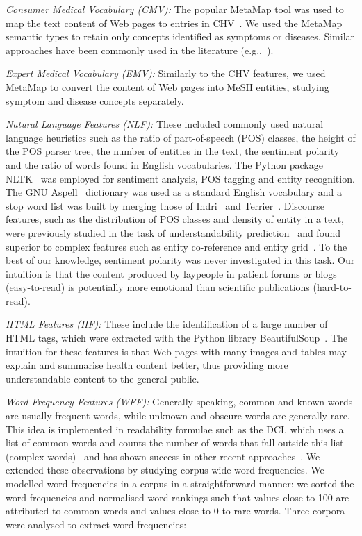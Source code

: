 \documentclass[10pt,a4paper]{article}
\begin{document}
\textit{Consumer Medical Vocabulary (CMV):}
The popular MetaMap \cite{aronson10} tool was used to map the text content of Web pages to entries in  CHV~\cite{zeng06}.
We used the MetaMap semantic types to retain only concepts identified as symptoms or diseases. Similar approaches have been commonly used in the literature (e.g.,~\cite{pang16,agrafiotesA16,palotti16,yates13}).

\textit{Expert Medical Vocabulary (EMV):}
Similarly to the CHV features, we used MetaMap to convert the content of Web pages into MeSH entities, studying symptom and disease concepts separately. 

\textit{Natural Language Features (NLF):}
These included commonly used natural language heuristics such as the ratio of part-of-speech (POS) classes, the height of the POS parser tree, the number of entities in the text, 
the sentiment polarity  and the ratio of words found in English vocabularies. The Python package NLTK~\cite{nltk} was employed for sentiment analysis, POS tagging and entity recognition. The GNU Aspell~\cite{aspell} dictionary was used as a standard English vocabulary and a stop word list was built by merging those of Indri~\cite{indri} and Terrier~\cite{terrier}. 
Discourse features, such as the distribution of POS classes and density of entity in a text, were previously studied in the task of understandability prediction~\cite{feng10} and found superior to complex features such as entity co-reference and entity grid~\cite{barzilay08}. To the best of our knowledge, sentiment polarity was never investigated in this task. Our intuition is that the content produced by laypeople in patient forums or blogs (easy-to-read) is potentially more emotional than scientific publications (hard-to-read).

\textit{HTML Features (HF):}
These include the identification of a large number of HTML tags, which were extracted with the Python library BeautifulSoup~\cite{bs4}. The intuition for these features is that Web pages with many images and tables may explain and summarise health content better, thus providing more understandable content to the general public. 

\textit{Word Frequency Features (WFF):}
Generally speaking, common and known words are usually frequent words, while unknown and obscure words are generally rare. This idea  is implemented in readability formulae such as the DCI, which uses a list of common words and counts the number of words that fall outside this list (complex words)~\cite{dale48} and has shown success in other recent approaches~\cite{elhadad06,wu15}.
We extended these observations by studying corpus-wide word frequencies. 
We modelled word frequencies in a corpus in a straightforward manner: we sorted the word frequencies and normalised word rankings such that values close to 100 are attributed to common words and values close to 0 to rare words. Three corpora were analysed to extract word frequencies:
\end{document}
